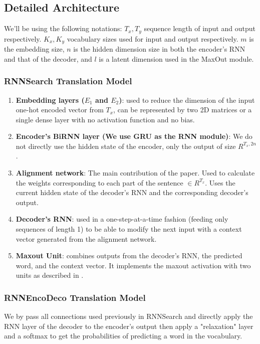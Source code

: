 \subsection{Detailed Architecture}

We'll be using the following notations: $T_x, T_y$ sequence length of input and output respectively. $K_x, K_y$ vocabulary sizes used for input and output respectively. $m$ is the embedding size, $n$ is the hidden dimension size in both the encoder's RNN and that of the decoder, and $l$ is a latent dimension used in the MaxOut module.
\subsubsection{RNNSearch Translation Model}
\begin{enumerate}
    \item \textbf{Embedding layers ($E_1$ and $E_2$)}: used to reduce the dimension of the input one-hot encoded vector from $T_x$, can be represented by two 2D matrices or a single dense layer with no activation function and no bias.
    
    \item \textbf{Encoder's BiRNN layer (We use GRU as the RNN module)}: We do not directly use the hidden state of the encoder, only the output of size $R^{T_x,2n}$.
    
    \item \textbf{Alignment network}: The main contribution of the paper. Used to calculate the weights corresponding to each part of the sentence $\in R^{T_x}$. Uses the current hidden state of the decoder's RNN and the corresponding decoder's output.
    
    \item \textbf{Decoder's RNN}: used in a one-step-at-a-time fashion (feeding only sequences of length 1) to be able to modify the next input with a context vector generated from the alignment network.
    
    \item \textbf{Maxout Unit}: combines outputs from the decoder's RNN, the predicted word, and the context vector. It implements the maxout activation with two units as described in \cite{Goodfellow-et-al-2016}.
\end{enumerate}
\subsubsection{RNNEncoDeco Translation Model}
We by pass all connections used previously in RNNSearch and directly apply the RNN layer of the decoder to the encoder's output then apply a "relaxation" layer and a softmax to get the probabilities of predicting a word in the vocabulary.

